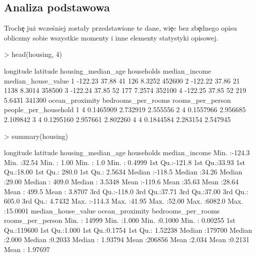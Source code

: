 \documentclass{article}
\begin{document}
\subsection{Analiza podstawowa}
\quad Troch\c e już wcześniej zosta\l y przedstawione te dane, wi\c ec bez zb\c ednego opisu obliczmy sobie wszystkie momenty i inne elementy statystyki opisowej.

\begin{Schunk}
\begin{Sinput}
> head(housing, 4)
\end{Sinput}
\begin{Soutput}
  longitude latitude housing_median_age households median_income median_house_value
1   -122.23    37.88                 41        126        8.3252             452600
2   -122.22    37.86                 21       1138        8.3014             358500
3   -122.24    37.85                 52        177        7.2574             352100
4   -122.25    37.85                 52        219        5.6431             341300
  ocean_proximity bedrooms_per_rooms rooms_per_person people_per_household
1               4          0.1465909         2.732919             2.555556
2               4          0.1557966         2.956685             2.109842
3               4          0.1295160         2.957661             2.802260
4               4          0.1844584         2.283154             2.547945
\end{Soutput}
\begin{Sinput}
> summary(housing)
\end{Sinput}
\begin{Soutput}
   longitude         latitude     housing_median_age   households     median_income    
 Min.   :-124.3   Min.   :32.54   Min.   : 1.00      Min.   :   1.0   Min.   : 0.4999  
 1st Qu.:-121.8   1st Qu.:33.93   1st Qu.:18.00      1st Qu.: 280.0   1st Qu.: 2.5634  
 Median :-118.5   Median :34.26   Median :29.00      Median : 409.0   Median : 3.5348  
 Mean   :-119.6   Mean   :35.63   Mean   :28.64      Mean   : 499.5   Mean   : 3.8707  
 3rd Qu.:-118.0   3rd Qu.:37.71   3rd Qu.:37.00      3rd Qu.: 605.0   3rd Qu.: 4.7432  
 Max.   :-114.3   Max.   :41.95   Max.   :52.00      Max.   :6082.0   Max.   :15.0001  
 median_house_value ocean_proximity bedrooms_per_rooms rooms_per_person  
 Min.   : 14999     Min.   :1.000   Min.   :0.1000     Min.   : 0.00255  
 1st Qu.:119600     1st Qu.:1.000   1st Qu.:0.1754     1st Qu.: 1.52238  
 Median :179700     Median :2.000   Median :0.2033     Median : 1.93794  
 Mean   :206856     Mean   :2.034   Mean   :0.2131     Mean   : 1.97697  

\end{Soutput}
\end{Schunk}
\end{document}
